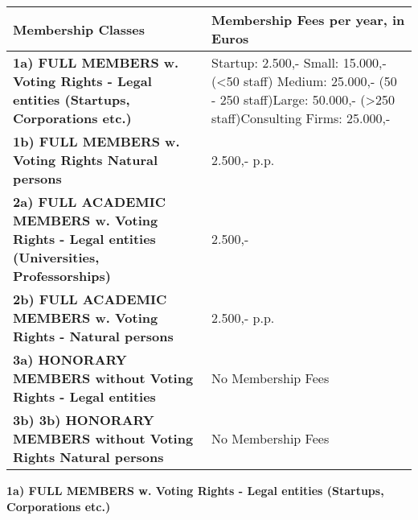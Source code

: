 \documentclass{article}
\begin{document}
\begin{longtable}{| p{} | p{} |}
	\hline
 	   \textbf{Membership Classes} & \textbf{Membership Fees per year, in Euros} \\ \hline\hline
 	   \textbf{1a) FULL MEMBERS w. Voting Rights - Legal entities (Startups, Corporations etc.)} &
	Startup: 2.500,- \newline Small: 15.000,- (\textless 50 staff) \newline Medium: 25.000,- (50 - 250 			staff)\newline Large: 50.000,- (\textgreater 250 staff)\newline Consulting Firms: 25.000,- \\
	\hline
		\textbf{1b) FULL MEMBERS w. Voting Rights Natural persons} & 2.500,- p.p. \\                                                                                                             	\hline
		\textbf{2a) FULL ACADEMIC MEMBERS w. Voting Rights - Legal entities (Universities, Professorships)} & 2.500,- \\                                                                                                             	\hline
		\textbf{2b) FULL ACADEMIC MEMBERS w. Voting Rights - Natural persons} & 2.500,-  p.p. \\                                                                                                             	\hline
		\textbf{3a) HONORARY MEMBERS without Voting Rights - Legal entities} & No Membership Fees \\                                                                                                             	\hline
		\textbf{3b) 3b) HONORARY MEMBERS without Voting Rights Natural persons} & No Membership Fees \\                                                                                                            
	\hline
\end{longtable}

\textbf{1a) FULL MEMBERS w. Voting Rights - Legal entities (Startups, Corporations etc.)} \\
\end{document}

